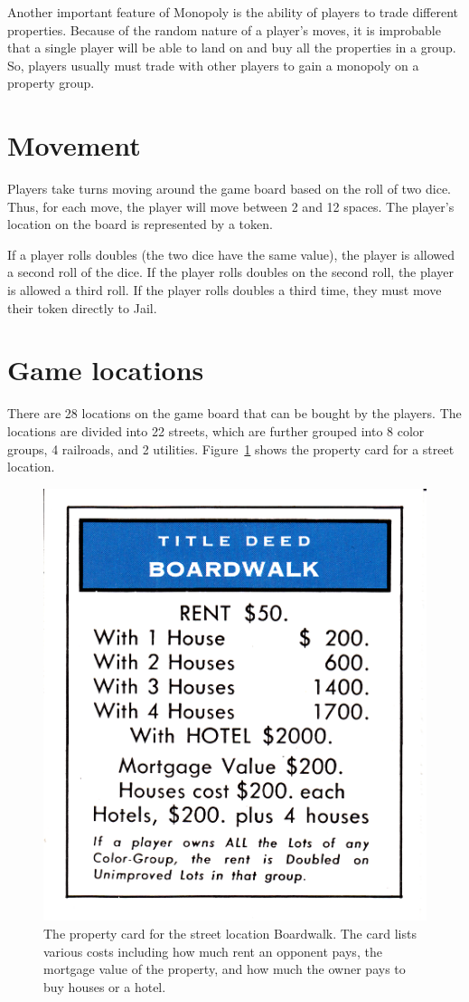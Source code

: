 Another important feature of Monopoly is the ability of players to trade
different properties. Because of the random nature of a player's moves, it is
improbable that a single player will be able to land on and buy all the
properties in a group. So, players usually must trade with other players to gain
a monopoly on a property group.

\section{Movement}
Players take turns moving around the game board based on the roll of two dice.
Thus, for each move, the player will move between 2 and 12 spaces. The player's
location on the board is represented by a token.

If a player rolls doubles (the two dice have the same value), the player is
allowed a second roll of the dice. If the player rolls doubles on the second
roll, the player is allowed a third roll. If the player rolls doubles a third
time, they must move their token directly to Jail.

\section{Game locations}
There are 28 locations on the game board that can be bought by the players. The
locations are divided into 22 streets, which are further grouped into 8 color
groups, 4 railroads, and 2 utilities. Figure~\ref{figure-street} shows the
property card for a street location.

\begin{figure}[htp]
\centerline{\includegraphics[width=0.5\columnwidth]{Figures/Boardwalk.png}}
\caption[Example property card]{The property card for the street location
Boardwalk. The card lists various costs including how much rent an opponent
pays, the mortgage value of the property, and how much the owner pays to buy
houses or a hotel.}
\label{figure-street}
\end{figure}

